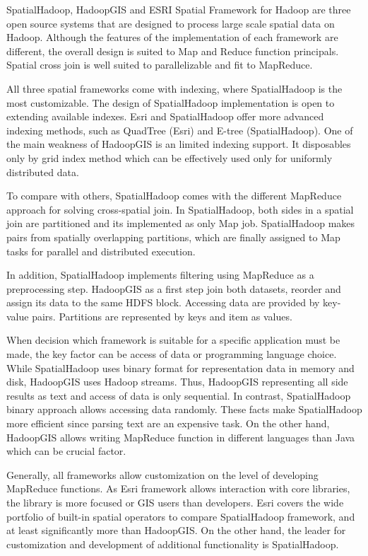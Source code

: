 \documentclass[a4paper,12pt,oneside]{report}
\begin{document}
	SpatialHadoop, HadoopGIS and ESRI Spatial Framework for Hadoop are
	three open source systems that are designed to process large scale
	spatial data on Hadoop. Although the features of  the implementation of each
	framework are different, 
	the overall design is suited to Map and Reduce function principals. Spatial
	cross join is well suited to parallelizable and fit to MapReduce. 
	
	All three spatial frameworks come with indexing, where SpatialHadoop is the most
	customizable. 
	The design of  SpatialHadoop implementation is open to extending available
	indexes. Esri and 
	SpatialHadoop offer more advanced indexing methods, such as 
	QuadTree (Esri) and E-tree (SpatialHadoop). One of the main weakness of HadoopGIS
	is an limited indexing 
	support. It disposables only by grid index method which can be 
	effectively used only for uniformly distributed data.
	
	To compare with others, SpatialHadoop comes with the different MapReduce
	approach for solving cross-spatial join.
	In SpatialHadoop, both sides in a spatial join are partitioned and its
	implemented as only 
	Map job.  SpatialHadoop makes pairs from spatially overlapping partitions, which
	are finally 
	assigned to Map tasks for parallel and distributed execution.
	
	In addition, SpatialHadoop implements filtering using MapReduce as a
	preprocessing step.
	HadoopGIS as a first step join both datasets, reorder and assign its data to the
	same 
	HDFS block.  Accessing data are provided by key-value pairs. Partitions are
	represented by keys and item as values. 
	
	When decision which framework is suitable for a specific application must be
	made, the 
	key factor can be access of data  or programming language choice. While
	SpatialHadoop 
	uses binary format for representation data in memory and disk, HadoopGIS 
	uses Hadoop streams. Thus, HadoopGIS representing all side results as text and
	access 
	of data is only sequential. In contrast, SpatialHadoop binary approach allows 
	accessing data randomly.
	These facts make SpatialHadoop more efficient since parsing text are an
	expensive task. 
	On the other hand, HadoopGIS allows writing MapReduce function in different
	languages than Java which can be crucial factor. 
	
	
	Generally, all frameworks allow customization on the level of developing
	Map\-Reduce functions. As Esri 
	framework allows interaction with core libraries, the library is more focused or
	GIS users than developers. 
	Esri covers the wide portfolio of built-in spatial operators to compare
	SpatialHadoop framework, 
	and at least significantly more than HadoopGIS. On the other hand, the leader
	for customization and 
	development of additional functionality is SpatialHadoop.
	
\end{document}
